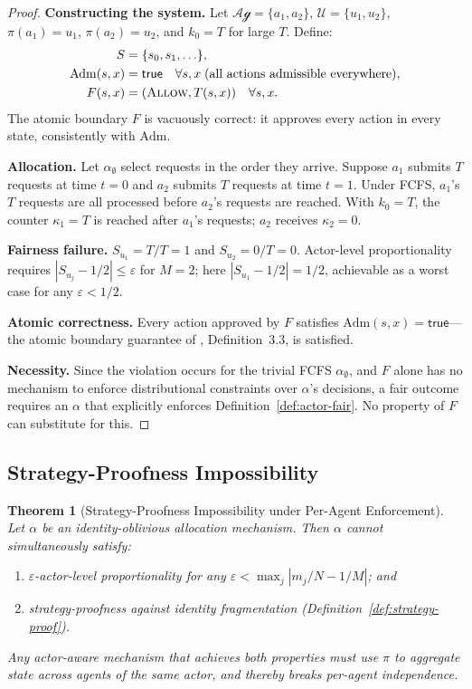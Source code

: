 \documentclass[11pt]{article}
\theoremstyle{plain}
\newtheorem{theorem}{Theorem}[section]
\theoremstyle{definition}
\theoremstyle{remark}
\newcommand{\Allow}{\textsc{Allow}}
\newcommand{\Adm}{\mathrm{Adm}}
\newcommand{\Agents}{\mathcal{Ag}}         %
\newcommand{\Actors}{\mathcal{U}}          %
\newcommand{\Share}[1]{S_{#1}}             %
\newcommand{\kbound}{k_0}                  %
\newcommand{\alloc}{\alpha}                %
\newcommand{\owner}{\pi}                   %
\begin{document}
\begin{proof}
\textbf{Constructing the system.}  Let $\Agents = \{a_1, a_2\}$,
$\Actors = \{u_1, u_2\}$, $\owner(a_1) = u_1$, $\owner(a_2) = u_2$,
and $\kbound = T$ for large $T$.  Define:
\begin{align*}
  S &= \{s_0, s_1, \ldots\}, \\
  \Adm(s, x) &= \mathsf{true} \quad \forall s, x
    \;\text{(all actions admissible everywhere)}, \\
  F(s, x) &= (\Allow, T(s,x)) \quad \forall s, x.
\end{align*}
The atomic boundary $F$ is vacuously correct: it approves every action
in every state, consistently with $\Adm$.

\textbf{Allocation.}  Let $\alloc_{\emptyset}$ select requests in
the order they arrive.  Suppose $a_1$ submits $T$ requests at time
$t = 0$ and $a_2$ submits $T$ requests at time $t = 1$.  Under FCFS,
$a_1$'s $T$ requests are all processed before $a_2$'s requests are
reached.  With $\kbound = T$, the counter $\kappa_1 = T$ is reached
after $a_1$'s requests; $a_2$ receives $\kappa_2 = 0$.

\textbf{Fairness failure.}  $\Share{u_1} = T/T = 1$ and $\Share{u_2}
= 0/T = 0$.  Actor-level proportionality requires $|\Share{u_j} - 1/2|
\leq \varepsilon$ for $M = 2$; here $|\Share{u_1} - 1/2| = 1/2$,
achievable as a worst case for any $\varepsilon < 1/2$.

\textbf{Atomic correctness.}  Every action approved by $F$ satisfies
$\Adm(s, x) = \mathsf{true}$---the atomic boundary guarantee of
\citet{fernandez2026a}, Definition~3.3, is satisfied.

\textbf{Necessity.}  Since the violation occurs for the trivial FCFS
$\alloc_{\emptyset}$, and $F$ alone has no mechanism to enforce
distributional constraints over $\alloc$'s decisions, a fair outcome
requires an $\alloc$ that explicitly enforces Definition~\ref{def:actor-fair}.
No property of $F$ can substitute for this.
\end{proof}

\subsection{Strategy-Proofness Impossibility}

\begin{theorem}[Strategy-Proofness Impossibility under Per-Agent Enforcement]
\label{thm:strategy}
Let $\alloc$ be an identity-oblivious allocation mechanism.  Then
$\alloc$ cannot simultaneously satisfy:
\begin{enumerate}[label=(\roman*)]
  \item $\varepsilon$-actor-level proportionality for any $\varepsilon <
    \max_j |m_j/N - 1/M|$; and
  \item strategy-proofness against identity fragmentation
    (Definition~\ref{def:strategy-proof}).
\end{enumerate}
Any actor-aware mechanism that achieves both properties must use
$\owner$ to aggregate state across agents of the same actor, and
thereby breaks per-agent independence.
\end{theorem}
\end{document}
